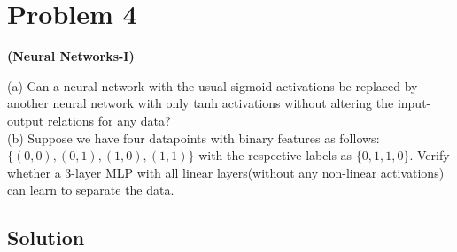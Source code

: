 \section*{Problem 4}

\textbf{(Neural Networks-I)}

(a) Can a neural network with the usual sigmoid activations be replaced by another neural network with only tanh activations without altering the input-output relations for any data?\\
(b) Suppose we have four datapoints with binary features as follows:\\
\( \{(0,0),(0,1),(1,0),(1,1)\} \) with the respective labels as \( \{0,1,1,0\} \). Verify whether a 3-layer MLP with all linear layers(without any non-linear activations) can learn to separate the data.

\subsection*{Solution}
